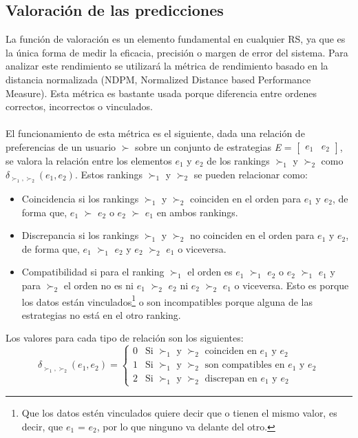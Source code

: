 \subsection{Valoración de las predicciones} \label{Valoracion}
La función de valoración es un elemento fundamental en cualquier RS, ya que es la única forma de medir la eficacia, precisión o margen de error del sistema. Para analizar este rendimiento se utilizará la métrica de rendimiento basado en la distancia normalizada (NDPM, Normalized Distance based Performance Measure). Esta métrica es bastante usada porque diferencia entre ordenes correctos, incorrectos o vinculados.
\\ \\
El funcionamiento de esta métrica es el siguiente, dada una relación de preferencias de un usuario $\succ$ sobre un conjunto de estrategias \textit{E} = $\begin{bmatrix} \textit{e$_{1}$} & \textit{e$_{2}$} \end{bmatrix}$, se valora la relación entre los elementos $e_1$ y $e_2$ de los rankings $\succ_1$ y $\succ_2$ como $\delta_{\succ_1, \succ_2}(e_1, e_2)$. Estos rankings $\succ_1$ y $\succ_2$ se pueden relacionar como:
\begin{itemize}
    \item Coincidencia si los rankings $\succ_1$ y $\succ_2$ coinciden en el orden para $e_1$ y $e_2$, de forma que, $e_1$ $\succ$ $e_2$ o $e_2$ $\succ$ $e_1$ en ambos rankings.
    \item Discrepancia si los rankings $\succ_1$ y $\succ_2$ no coinciden en el orden para $e_1$ y $e_2$, de forma que, $e_1$ $\succ_1$ $e_2$ y $e_2$ $\succ_2$ $e_1$ o viceversa. 
    \item Compatibilidad si para el ranking $\succ_1$ el orden es $e_1$ $\succ_1$ $e_2$ o $e_2$ $\succ_1$ $e_1$ y para $\succ_2$ el orden no es ni $e_1$ $\succ_2$ $e_2$ ni $e_2$ $\succ_2$ $e_1$ o viceversa. Esto es porque los datos están vinculados\footnote{Que los datos estén vinculados quiere decir que o tienen el mismo valor, es decir, que $e_1$ = $e_2$, por lo que ninguno va delante del otro.} o son incompatibles porque alguna de las estrategias no está en el otro ranking.   
\end{itemize}
Los valores para cada tipo de relación son los siguientes: 
\[ 
    \delta_{\succ_1, \succ_2}(e_1, e_2) =
    \begin{cases} 
        \mbox{0} & \mbox{Si $\succ_1$ y $\succ_2$ coinciden en $e_1$ y $e_2$} \\
        \mbox{1} & \mbox{Si $\succ_1$ y $\succ_2$ son compatibles en $e_1$ y $e_2$} \\
        \mbox{2} & \mbox{Si $\succ_1$ y $\succ_2$ discrepan en $e_1$ y $e_2$}
    
    \end{cases}
\]
